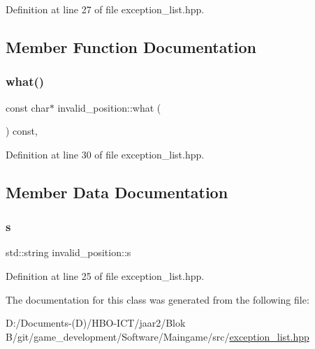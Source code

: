 Definition at line 27 of file exception\+\_\+list.\+hpp.



\subsection{Member Function Documentation}
\mbox{\label{classinvalid__position_a06163ba7cde1c818d7fd52b13686aad4}} 
\subsubsection{\texorpdfstring{what()}{what()}}
{\footnotesize\ttfamily const char$\ast$ invalid\+\_\+position\+::what (\begin{DoxyParamCaption}{ }\end{DoxyParamCaption}) const\hspace{0.3cm}{\ttfamily [inline]}, {\ttfamily [override]}}



Definition at line 30 of file exception\+\_\+list.\+hpp.



\subsection{Member Data Documentation}
\mbox{\label{classinvalid__position_a583ac2c97b1c840be45d66f39c079082}} 
\subsubsection{\texorpdfstring{s}{s}}
{\footnotesize\ttfamily std\+::string invalid\+\_\+position\+::s\hspace{0.3cm}{\ttfamily [private]}}



Definition at line 25 of file exception\+\_\+list.\+hpp.



The documentation for this class was generated from the following file\+:\begin{DoxyCompactItemize}
\item 
D\+:/\+Documents-\/(\+D)/\+H\+B\+O-\/\+I\+C\+T/jaar2/\+Blok B/git/game\+\_\+development/\+Software/\+Maingame/src/\hyperlink{exception__list_8hpp}{exception\+\_\+list.\+hpp}\end{DoxyCompactItemize}
